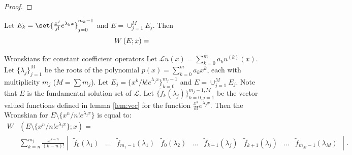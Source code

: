 \documentclass{book}
\begin{document}
\begin{proof}
\end{proof}

\begin{cor}
Let $E_k = \set{\Poly{j} e^{\lambda_k x}}_{j=0}^{m_k-1}$ and $E = \cup_{j=1}^M E_j$.
Then 
\begin{equation*}
W \left ( E ; x \right ) =
\end{equation*}
\end{cor}

\begin{thm}{Wronskians for constant coefficient operators}
Let $\mathcal{L} u(x) = \sum_{k=0}^m a_k u^{(k)}(x)$.
Let $\{ \lambda_j \}_{j=1}^M$ be the roots of the polynomial $p(x) = \sum_{k=0}^m a_k x^k$, each with multiplicity $m_j$ ($M = \sum m_j$).
Let $E_j = \{ x^k/k! e^{\lambda_j x} \}_{k=0}^{m_j-1}$ and $E = \cup_{j=1}^M E_j$.
Note that $E$ is the fundamental solution set of $\mathcal{L}$.
Let $\{ \tilde{f}_k(\lambda_j) \}_{k=0,j=1}^{m_j-1,M}$ be the vector valued functions defined in lemma \ref{lem:vec} for the function $\frac{x^k}{k!} e^{\lambda_j x}$.
Then the Wronskian for $E \setminus \{ x^n/n! e^{\lambda_j x} \}$ is equal to:
\begin{align*}
W & (E \setminus \{ x^n/n! e^{\lambda_j x} \} ; x) = \\
& \sum_{k=n}^{m_j} \frac{x^{k-n}}{(k-n)!} \begin{vmatrix} \tilde{f}_0(\lambda_1) & \dots & \tilde{f}_{m_1-1}(\lambda_1) & \tilde{f}_0(\lambda_2) & \dots
& \tilde{f}_{k-1}(\lambda_j) & \tilde{f}_{k+1}(\lambda_j) & \dots & \tilde{f}_{m_M-1}(\lambda_M) \end{vmatrix} .
\end{align*} \label{thm:wcc}
\end{thm}
\end{document}
